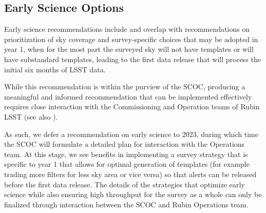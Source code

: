 \subsection{Early Science Options}\label{q:Early}
Early science recommendations include and overlap with recommendations on prioritization of sky coverage and survey-specific choices that may be adopted in year 1, when for the most part the surveyed sky will not have templates or will have substandard templates, leading to the first data release that will process the initial six months of LSST data. 

While this recommendation is within the purview of the SCOC, producing a meaningful and informed recommendation that can be implemented effectively requires close interaction with the Commissioning and Operation teams of Rubin LSST (see also ).

As such, we defer a  recommendation on early science to 2023, during which time the SCOC will formulate a detailed plan for interaction with the Operations team. At this stage, we see benefits in implementing a survey strategy that is specific to year 1 that allows for optimal generation of templates (for example trading more filters for less sky area or vice versa) so that alerts can be released before the first data release. The details of the strategies that optimize early science while also ensuring high throughput for the survey as a whole can only be finalized through interaction between the SCOC and Rubin Operations team. 

